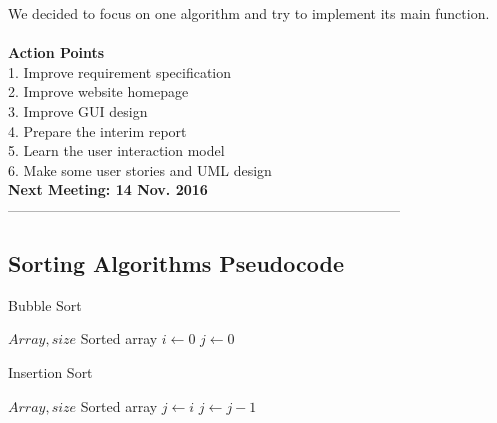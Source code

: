 \documentclass[paper=a4, fontsize=11pt,twoside]{scrartcl}		%
\begin{document}
	We decided to focus on one algorithm and try to implement its main function. \\\\

\textbf{Action Points}\\
1.	Improve requirement specification\\
2.	Improve website homepage\\
3.	Improve GUI design\\
4.	Prepare the interim report\\
5.	Learn the user interaction model\\
6.	Make some user stories and UML design\\


\textbf{Next Meeting: 14 Nov. 2016}\\
------------------------------------------------------------------------------------\\

\subsection{Sorting Algorithms Pseudocode}
\renewcommand{\algorithmicrequire}{\textbf{Input:}}
\renewcommand{\algorithmicensure}{\textbf{Output:}}
    \begin{algorithm}
        \caption{Bubble Sort}
        \begin{algorithmic}[1] 
            \Require $Array,size$
            \Ensure Sorted array
                \State $i \gets 0$
                \State $j \gets 0$
                    \State {}
                    \EndIf
                  \EndFor
                \EndFor
            \EndFunction
        \end{algorithmic}
    \end{algorithm}

\renewcommand{\algorithmicrequire}{\textbf{Input:}}
\renewcommand{\algorithmicensure}{\textbf{Output:}}
    \begin{algorithm}
        \caption{Insertion Sort}
        \begin{algorithmic}[1] 
            \Require $Array,size$
            \Ensure Sorted array
                 \State $j \gets i$
                \State {}
                \State $j \gets j-1$
                \EndWhile
                \EndFor
            \EndFunction
        \end{algorithmic}
    \end{algorithm}
    
\end{document}
